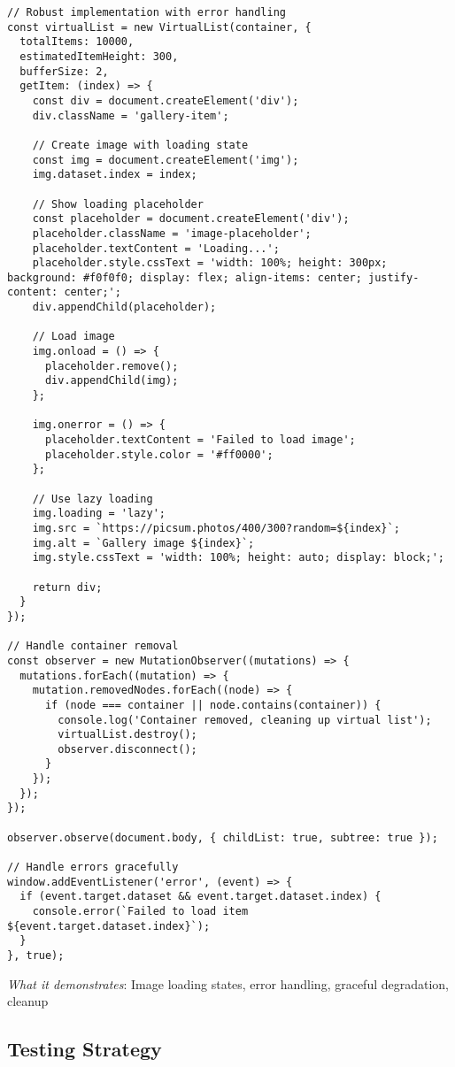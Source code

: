 \documentclass[11pt]{article}
\begin{document}
\begin{verbatim}
// Robust implementation with error handling
const virtualList = new VirtualList(container, {
  totalItems: 10000,
  estimatedItemHeight: 300,
  bufferSize: 2,
  getItem: (index) => {
    const div = document.createElement('div');
    div.className = 'gallery-item';
    
    // Create image with loading state
    const img = document.createElement('img');
    img.dataset.index = index;
    
    // Show loading placeholder
    const placeholder = document.createElement('div');
    placeholder.className = 'image-placeholder';
    placeholder.textContent = 'Loading...';
    placeholder.style.cssText = 'width: 100%; height: 300px; background: #f0f0f0; display: flex; align-items: center; justify-content: center;';
    div.appendChild(placeholder);
    
    // Load image
    img.onload = () => {
      placeholder.remove();
      div.appendChild(img);
    };
    
    img.onerror = () => {
      placeholder.textContent = 'Failed to load image';
      placeholder.style.color = '#ff0000';
    };
    
    // Use lazy loading
    img.loading = 'lazy';
    img.src = `https://picsum.photos/400/300?random=${index}`;
    img.alt = `Gallery image ${index}`;
    img.style.cssText = 'width: 100%; height: auto; display: block;';
    
    return div;
  }
});

// Handle container removal
const observer = new MutationObserver((mutations) => {
  mutations.forEach((mutation) => {
    mutation.removedNodes.forEach((node) => {
      if (node === container || node.contains(container)) {
        console.log('Container removed, cleaning up virtual list');
        virtualList.destroy();
        observer.disconnect();
      }
    });
  });
});

observer.observe(document.body, { childList: true, subtree: true });

// Handle errors gracefully
window.addEventListener('error', (event) => {
  if (event.target.dataset && event.target.dataset.index) {
    console.error(`Failed to load item ${event.target.dataset.index}`);
  }
}, true);
\end{verbatim}

\emph{What it demonstrates}: Image loading states, error handling, graceful degradation, cleanup
\subsection{Testing Strategy}
\label{sec:org9f478f1}
\end{document}
